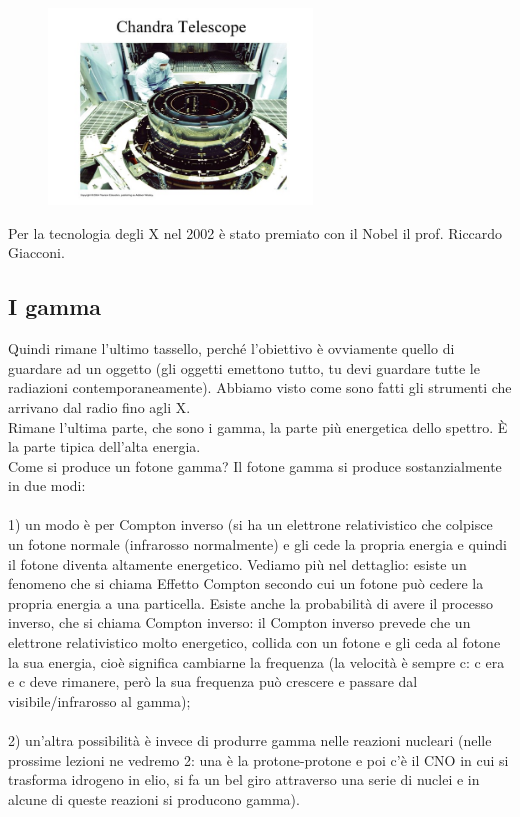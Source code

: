 \documentclass[a4paper,11pt]{article}
\begin{document}
\begin{figure}[h!!]
        \centering
        \includegraphics[width=7cm]{37.jpg}
        \label{}
    \end{figure}

Per la tecnologia degli X nel 2002 è stato premiato con il Nobel il prof. Riccardo Giacconi.
\newpage
\subsection{I gamma}
Quindi rimane l’ultimo tassello, perché l’obiettivo è ovviamente quello di guardare ad un oggetto (gli oggetti emettono tutto, tu devi guardare tutte le radiazioni contemporaneamente). Abbiamo visto come sono fatti gli strumenti che arrivano dal radio fino agli X.\\ 
Rimane l’ultima parte, che sono i gamma, la parte più energetica dello spettro. È la parte tipica dell’alta energia.\\
Come si produce un fotone gamma? Il fotone gamma si produce sostanzialmente in due modi:\\\\
1) un modo è per Compton inverso (si ha un elettrone relativistico che colpisce un fotone normale (infrarosso normalmente) e gli cede la propria energia e quindi il fotone diventa altamente energetico.
Vediamo più nel dettaglio: esiste un fenomeno che si chiama Effetto Compton secondo cui un fotone può cedere la propria energia a una particella. Esiste anche la probabilità di avere il processo inverso, che si chiama Compton inverso: il Compton inverso prevede che un elettrone relativistico molto energetico, collida con un fotone e gli ceda al fotone la sua energia, cioè significa cambiarne la frequenza (la velocità è sempre c: c era e c deve rimanere, però la sua frequenza può crescere e passare dal visibile/infrarosso al gamma);\\\\ 
2) un’altra possibilità è invece di produrre gamma nelle reazioni nucleari (nelle prossime lezioni ne vedremo 2: una è la protone-protone e poi c’è il CNO in cui si trasforma idrogeno in elio, si fa un bel giro attraverso una serie di nuclei e in alcune di queste reazioni si producono gamma).\\\\
\end{document}
